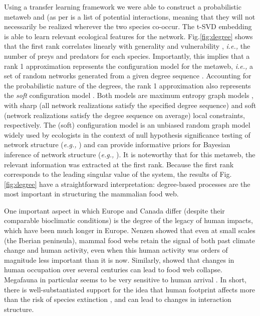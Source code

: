 Using a transfer learning framework we were able to construct a
probabilistic metaweb and (as per \cite{Dunne2006NetStr} is a list of
potential interactions, meaning that they will not necessarily be
realized wherever the two species co-occur. The t-SVD embedding is able
to learn relevant ecological features for the network. Fig.\ref{fig:degree} shows
that the first rank correlates linearly with generality and
vulnerability \cite{Schoener1989FooWeb}, \emph{i.e.,} the number of preys
and predators for each species. Importantly, this implies that a rank 1
approximation represents the configuration model for the metaweb,
\emph{i.e.,} a set of random networks generated from a given degree
sequence \cite{Park2004StaMec}. Accounting for the probabilistic nature
of the degrees, the rank 1 approximation also represents the \emph{soft}
configuration model \cite{vanderHoorn2018SpaMax}. Both models are
maximum entropy graph models \cite{Garlaschelli2018CovStr}, with sharp
(all network realizations satisfy the specified degree sequence) and
soft (network realizations satisfy the degree sequence on average) local
constraints, respectively. The (soft) configuration model is an unbiased
random graph model widely used by ecologists in the context of null
hypothesis significance testing of network structure (\emph{e.g.,}
\cite{Bascompte2003NesAss}) and can provide informative priors for Bayesian
inference of network structure (\emph{e.g.,} \cite{Young2021BayInf}). It is
noteworthy that for this metaweb, the relevant information was extracted
at the first rank. Because the first rank corresponds to the leading
singular value of the system, the results of Fig.\ref{fig:degree} have a
straightforward interpretation: degree-based processes are the most
important in structuring the mammalian food web.

One important aspect in which Europe and Canada differ (despite their
comparable bioclimatic conditions) is the degree of the legacy of human
impacts, which have been much longer in Europe. Nenzen \cite{Nenzen2014Imp850} showed
that even at small scales (the Iberian peninsula), mammal food webs
retain the signal of both past climate change and human activity, even
when this human activity was orders of magnitude less important than it
is now. Similarly, \cite{Yeakel2014ColEco} showed that changes in human
occupation over several centuries can lead to food web collapse.
Megafauna in particular seems to be very sensitive to human arrival
\cite{Pires2015PleMeg}. In short, there is well-substantiated support
for the idea that human footprint affects more than the risk of species
extinction \cite{Marco2018ChaHum}, and can lead to changes in
interaction structure.

